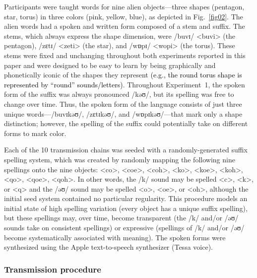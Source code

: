 \documentclass[doc,biblatex]{apa7}
\newcommand\firstrevision[1]{\textcolor{black}{#1}}
\begin{document}
Participants were taught words for nine alien objects---three shapes (pentagon, star, torus) in three colors (pink, yellow, blue), as depicted in Fig.~\ref{fig02}. The alien words had a spoken and written form composed of a stem and suffix. The stems, which always express the shape dimension, were /buvɪ/ <buvi> (the pentagon), /zɛtɪ/ <zeti> (the star), and /wɒpɪ/ <wopi> (the torus). These stems were fixed and unchanging throughout both experiments reported in this paper and were designed to be easy to learn by being graphically and phonetically iconic of the shapes they represent \firstrevision{(e.g., the round torus shape is represented by ``round'' sounds/letters)}. Throughout Experiment~1, the spoken form of the suffix was always pronounced /kəʊ/, but its spelling was free to change over time. Thus, the spoken form of the language consists of just three unique words---/buvɪkəʊ/, /zɛtɪkəʊ/, and /wɒpɪkəʊ/---that mark only a shape distinction; however, the spelling of the suffix could potentially take on different forms to mark color.

Each of the 10 transmission chains was seeded with a randomly-generated suffix spelling system, which was created by randomly mapping the following nine spellings onto the nine objects: <co>, <coe>, <coh>, <ko>, <koe>, <koh>, <qo>, <qoe>, <qoh>. In other words, the /k/ sound may be spelled <c>, <k>, or <q> and the /əʊ/ sound may be spelled <o>, <oe>, or <oh>, although the initial seed system contained no particular regularity. This procedure models an initial state of high spelling variation (every object has a unique suffix spelling), but these spellings may, over time, become transparent (the /k/ and/or /əʊ/ sounds take on consistent spellings) or expressive (spellings of /k/ and/or /əʊ/ become systematically associated with meaning). The spoken forms were synthesized using the Apple text-to-speech synthesizer (Tessa voice).

\subsubsection{Transmission procedure}
\end{document}
